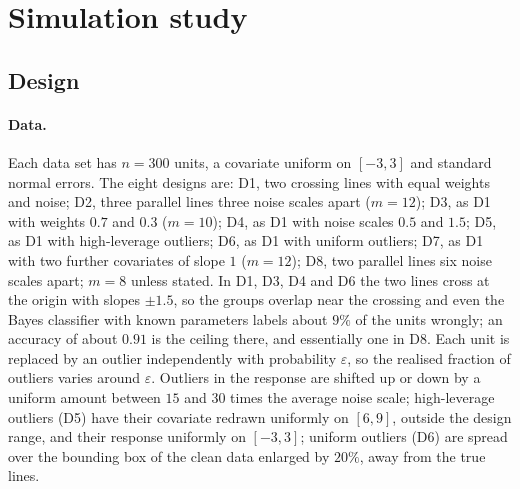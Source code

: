 \section{Simulation study}
\label{sec:simulation}

\subsection{Design}
\label{sec:design}

\paragraph{Data.} Each data set has $n=300$ units, a covariate uniform on $[-3,3]$ and standard
normal errors. The eight designs are: D1, two crossing lines with equal weights and noise;
D2, three parallel lines three noise scales apart ($m=12$); D3, as D1 with weights $0.7$ and
$0.3$ ($m=10$); D4, as D1 with noise scales $0.5$ and $1.5$; D5, as D1 with high-leverage
outliers; D6, as D1 with uniform outliers; D7, as D1 with two further covariates of slope $1$
($m=12$); D8, two parallel lines six noise scales apart; $m=8$ unless stated. In D1, D3, D4
and D6 the two lines cross at the origin with slopes $\pm1.5$, so the groups overlap near the
crossing and even the Bayes classifier with known parameters labels about $9\%$ of the units
wrongly; an accuracy of about $0.91$ is the ceiling there, and essentially one in D8. Each
unit is replaced by an outlier independently with probability $\varepsilon$, so the realised
fraction of outliers varies around $\varepsilon$. Outliers in the response are shifted up or
down by a uniform amount between $15$ and $30$ times the average noise scale; high-leverage
outliers (D5) have their covariate redrawn uniformly on $[6,9]$, outside the design range, and
their response uniformly on $[-3,3]$; uniform outliers (D6) are spread over the bounding box
of the clean data enlarged by $20\%$, away from the true lines.

